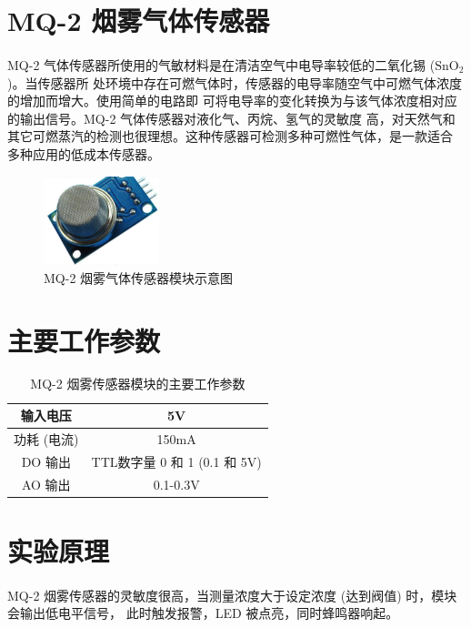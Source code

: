 \documentclass[UTF8, oneside]{ctexbook}
\begin{document}
\section{MQ-2 烟雾气体传感器}
\paragraph{}
MQ-2 气体传感器所使用的气敏材料是在清洁空气中电导率较低的二氧化锡 ($\text{SnO}_2$)。当传感器所
处环境中存在可燃气体时，传感器的电导率随空气中可燃气体浓度的增加而增大。使用简单的电路即
可将电导率的变化转换为与该气体浓度相对应的输出信号。MQ-2 气体传感器对液化气、丙烷、氢气的灵敏度
高，对天然气和其它可燃蒸汽的检测也很理想。这种传感器可检测多种可燃性气体，是一款适合
多种应用的低成本传感器。
\begin{figure}[h]
    \centering
    \includegraphics[width=0.3\textwidth]{./result/sensor/24/sensor.png}
    \caption{MQ-2 烟雾气体传感器模块示意图}
    \label{24_sensor}
\end{figure}

\section{主要工作参数}
\begin{table}[h]
    \centering
    \begin{tabular}{|c|c|}
    \hline
    输入电压    & 5V                      \\ \hline
    功耗 (电流) & 150mA                   \\ \hline
    DO 输出   & TTL数字量 0 和 1 (0.1 和 5V) \\ \hline
    AO 输出   & 0.1-0.3V                \\ \hline
    \end{tabular}
    \caption{MQ-2 烟雾传感器模块的主要工作参数}
\end{table}

\section{实验原理}
\paragraph{}
MQ-2 烟雾传感器的灵敏度很高，当测量浓度大于设定浓度 (达到阀值) 时，模块会输出低电平信号，
此时触发报警，LED 被点亮，同时蜂鸣器响起。
\end{document}
